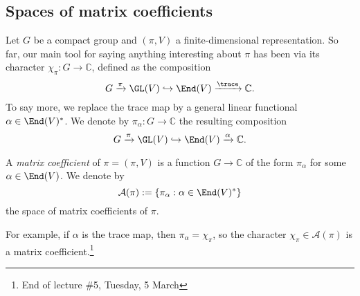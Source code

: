 \documentclass[reqno]{amsart} 
\begin{document}
\subsection{Spaces of matrix coefficients}\label{sec:cnh2vooenj}
Let $G$ be a compact group and $(\pi,V)$ a finite-dimensional representation.  So far, our main tool for saying anything interesting about $\pi$ has been via its character $\chi_\pi : G \rightarrow \mathbb{C}$, defined as the composition
\begin{equation*}
  G \xrightarrow{\pi } \GL(V) \hookrightarrow \End(V)
  \xrightarrow{\trace} \mathbb{C}.
\end{equation*}
To say more, we replace the trace map by a general linear functional $\alpha \in \End(V)^*$.  We denote by $\pi_\alpha : G \rightarrow \mathbb{C}$ the resulting composition
\begin{equation*}
  G \xrightarrow{\pi } \GL(V)
  \hookrightarrow \End(V)
  \xrightarrow{\alpha } \mathbb{C}.
\end{equation*}
\begin{definition}
  A \emph{matrix coefficient} of $\pi = (\pi,V)$ is a function $G \rightarrow \mathbb{C}$ of the form $\pi_\alpha$ for some $\alpha \in \End(V)$.  We denote by
  \begin{equation*}
    \mathcal{A}(\pi) := \{\pi_\alpha : \alpha \in \End(V)^*\}
  \end{equation*}
  the space of matrix coefficients of $\pi$.
\end{definition}
For example, if $\alpha$ is the trace map, then $\pi_\alpha = \chi_\pi$, so the character $\chi_\pi \in \mathcal{A}(\pi)$ is a matrix coefficient.\footnote{End of lecture \#5, Tuesday, 5 March}
\end{document}
